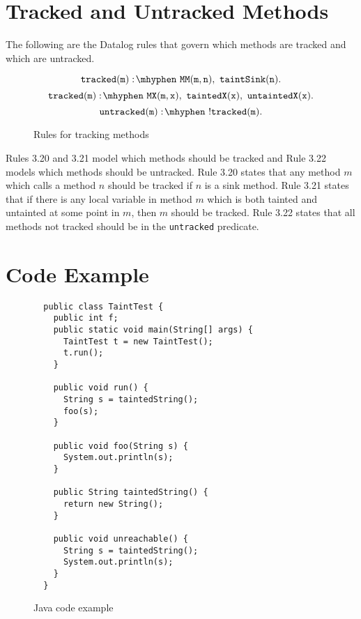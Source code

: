 \section{Tracked and Untracked Methods}
The following are the Datalog rules that govern which methods are
tracked and which are untracked.
\begin{figure}[H]
\begin{equation}
  \mathtt{tracked(m) \is MM(m,n) \also taintSink(n).}
\end{equation}
\begin{equation}
  \mathtt{tracked(m) \is MX(m,x) \also taintedX(x) \also
    untaintedX(x).}
\end{equation}
\begin{equation}
  \mathtt{untracked(m) \is !tracked(m).}
\end{equation}
\caption{Rules for tracking methods}\label{fig:tracked}
\end{figure}

Rules 3.20 and 3.21 model which methods should be tracked and Rule
3.22 models which methods should be untracked. Rule 3.20 states that
any method $m$ which calls a method $n$ should be tracked if $n$ is a
sink method. Rule 3.21 states that if there is any local variable in
method $m$ which is both tainted and untainted at some point in $m$,
then $m$ should be tracked. Rule 3.22 states that all methods not
tracked should be in the \texttt{untracked} predicate.

\section{Code Example} \label{ex}

\begin{figure}[H]
\begin{lstlisting}
  public class TaintTest {
    public int f;
    public static void main(String[] args) {
      TaintTest t = new TaintTest();
      t.run();
    }

    public void run() {
      String s = taintedString();
      foo(s);
    }

    public void foo(String s) {
      System.out.println(s);
    }

    public String taintedString() {
      return new String();
    }
    
    public void unreachable() {
      String s = taintedString();
      System.out.println(s);
    }
  }
\end{lstlisting}
\caption{Java code example}\label{fig:ex}
\end{figure}


